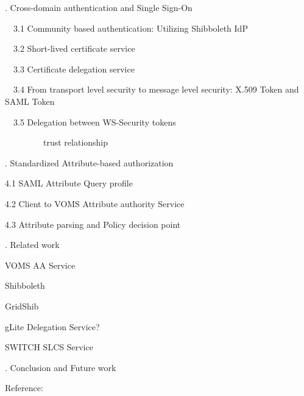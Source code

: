 \documentclass{article}
\begin{document}
\bigskip

{. Cross-domain authentication and Single Sign-On
\par}


\bigskip


\bigskip

\ \ 3.1 Community based authentication: Utilizing Shibboleth IdP


\bigskip

\ \ 3.2 Short-lived certificate service


\bigskip

\ \ 3.3 Certificate delegation service


\bigskip

\ \ 3.4 From transport level security to message level security: X.509
Token and SAML Token


\bigskip


\bigskip

\ \ 3.5 Delegation between WS-Security tokens


\bigskip

\ \ \ \ \ \ \ \ \ trust relationship


\bigskip

{. Standardized Attribute-based authorization 
\par}


\bigskip

4.1 SAML Attribute Query profile


\bigskip

4.2 Client to VOMS Attribute authority Service


\bigskip

4.3 Attribute parsing and Policy decision point


\bigskip


\bigskip


\bigskip

{. Related work
\par}

VOMS AA Service

Shibboleth

GridShib

gLite Delegation Service?

SWITCH SLCS Service


\bigskip

{. Conclusion and Future work
\par}


\bigskip


\bigskip

Reference:


\bigskip
\end{document}
